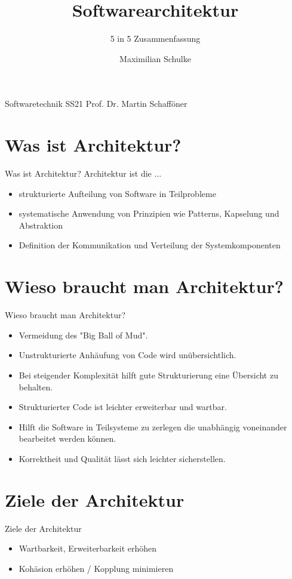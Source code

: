 \documentclass{beamer}
\title{Softwarearchitektur}
\subtitle{5 in 5 Zusammenfassung}
\author{Maximilian Schulke}
\begin{document}
\begin{frame}
	Softwaretechnik \hfill SS21
	\titlepage
	Prof. Dr. Martin Schafföner
\end{frame}

\section{Was ist Architektur?}

\begin{frame}{Was ist Architektur?}
	Architektur ist die ...
	\begin{itemize}
		\item{strukturierte Aufteilung von Software in Teilprobleme}
		\item{systematische Anwendung von Prinzipien wie Patterns, Kapselung und
			Abstraktion}
		\item{Definition der Kommunikation und Verteilung der
			Systemkomponenten}
	\end{itemize}
\end{frame}

\section{Wieso braucht man Architektur?}

\begin{frame}{Wieso braucht man Architektur?}
	\begin{itemize}
		\item{Vermeidung des "Big Ball of Mud".}
		\item{Unstrukturierte Anhäufung von Code wird unübersichtlich.}
		\item{Bei steigender Komplexität hilft gute Strukturierung eine
			Übersicht zu behalten.}
		\item{Strukturierter Code ist leichter erweiterbar und wartbar.}
		\item{Hilft die Software in Teilsysteme zu zerlegen die unabhängig
			voneinander bearbeitet werden können.}
		\item{Korrektheit und Qualität lässt sich leichter sicherstellen.}
	\end{itemize}
\end{frame}

\section{Ziele der Architektur}

\begin{frame}{Ziele der Architektur}
	\begin{itemize}
		\item{Wartbarkeit, Erweiterbarkeit erhöhen}
		\item{Kohäsion erhöhen / Kopplung minimieren}
	\end{itemize}
\end{frame}
\end{document}
